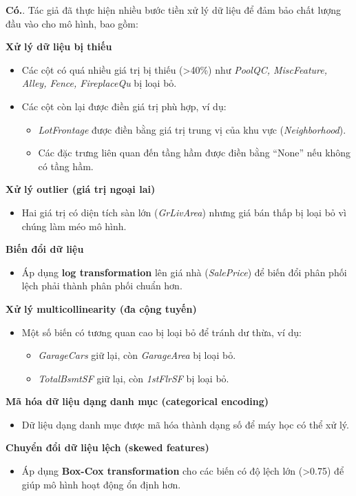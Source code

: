 \textbf{Có.}. Tác giả đã thực hiện nhiều bước tiền xử lý dữ liệu để đảm bảo chất lượng đầu vào cho mô hình, bao gồm:

\textbf{\large Xử lý dữ liệu bị thiếu}
\begin{itemize}
    \item Các cột có quá nhiều giá trị bị thiếu (>40\%) như \textit{PoolQC, MiscFeature, Alley, Fence, FireplaceQu} bị loại bỏ.
    \item Các cột còn lại được điền giá trị phù hợp, ví dụ:
    \begin{itemize}
        \item \textit{LotFrontage} được điền bằng giá trị trung vị của khu vực (\textit{Neighborhood}).
        \item Các đặc trưng liên quan đến tầng hầm được điền bằng ``None'' nếu không có tầng hầm.
    \end{itemize}
\end{itemize}

\textbf{\large Xử lý outlier (giá trị ngoại lai)}
\begin{itemize}
    \item Hai giá trị có diện tích sàn lớn (\textit{GrLivArea}) nhưng giá bán thấp bị loại bỏ vì chúng làm méo mô hình.
\end{itemize}

\textbf{\large Biến đổi dữ liệu}
\begin{itemize}
    \item Áp dụng \textbf{log transformation} lên giá nhà (\textit{SalePrice}) để biến đổi phân phối lệch phải thành phân phối chuẩn hơn.
\end{itemize}

\textbf{\large Xử lý multicollinearity (đa cộng tuyến)}
\begin{itemize}
    \item Một số biến có tương quan cao bị loại bỏ để tránh dư thừa, ví dụ:
    \begin{itemize}
        \item \textit{GarageCars} giữ lại, còn \textit{GarageArea} bị loại bỏ.
        \item \textit{TotalBsmtSF} giữ lại, còn \textit{1stFlrSF} bị loại bỏ.
    \end{itemize}
\end{itemize}

\textbf{\large Mã hóa dữ liệu dạng danh mục (categorical encoding)}
\begin{itemize}
    \item Dữ liệu dạng danh mục được mã hóa thành dạng số để máy học có thể xử lý.
\end{itemize}

\textbf{\large Chuyển đổi dữ liệu lệch (skewed features)}
\begin{itemize}
    \item Áp dụng \textbf{Box-Cox transformation} cho các biến có độ lệch lớn (>0.75) để giúp mô hình hoạt động ổn định hơn.
\end{itemize}
